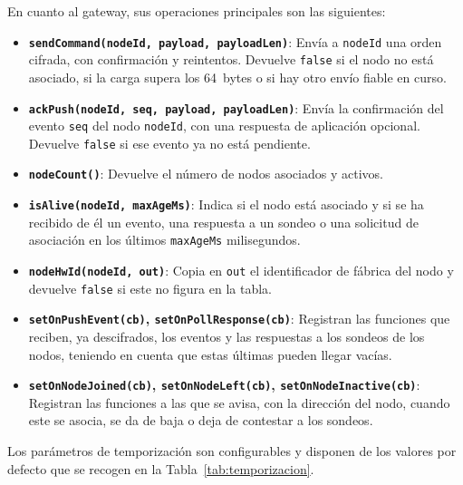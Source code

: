 En cuanto al gateway, sus operaciones principales son las siguientes:

\begin{itemize}
\item \textbf{\texttt{sendCommand(nodeId, payload, payloadLen)}}: Envía a \texttt{nodeId} una orden cifrada, con confirmación y reintentos. Devuelve \texttt{false} si el nodo no está asociado, si la carga supera los 64~bytes o si hay otro envío fiable en curso.

\item \textbf{\texttt{ackPush(nodeId, seq, payload, payloadLen)}}: Envía la confirmación del evento \texttt{seq} del nodo \texttt{nodeId}, con una respuesta de aplicación opcional. Devuelve \texttt{false} si ese evento ya no está pendiente.

\item \textbf{\texttt{nodeCount()}}: Devuelve el número de nodos asociados y activos.

\item \textbf{\texttt{isAlive(nodeId, maxAgeMs)}}: Indica si el nodo está asociado y si se ha recibido de él un evento, una respuesta a un sondeo o una solicitud de asociación en los últimos \texttt{maxAgeMs} milisegundos.

\item \textbf{\texttt{nodeHwId(nodeId, out)}}: Copia en \texttt{out} el identificador de fábrica del nodo y devuelve \texttt{false} si este no figura en la tabla.

\item \textbf{\texttt{setOnPushEvent(cb)}, \texttt{setOnPollResponse(cb)}}: Registran las funciones que reciben, ya descifrados, los eventos y las respuestas a los sondeos de los nodos, teniendo en cuenta que estas últimas pueden llegar vacías.

\item \textbf{\texttt{setOnNodeJoined(cb)}, \texttt{setOnNodeLeft(cb)}, \texttt{setOnNodeInactive(cb)}}: Registran las funciones a las que se avisa, con la dirección del nodo, cuando este se asocia, se da de baja o deja de contestar a los sondeos.
\end{itemize}

Los parámetros de temporización son configurables y disponen de los valores por defecto que se recogen en la Tabla~\ref{tab:temporizacion}.

